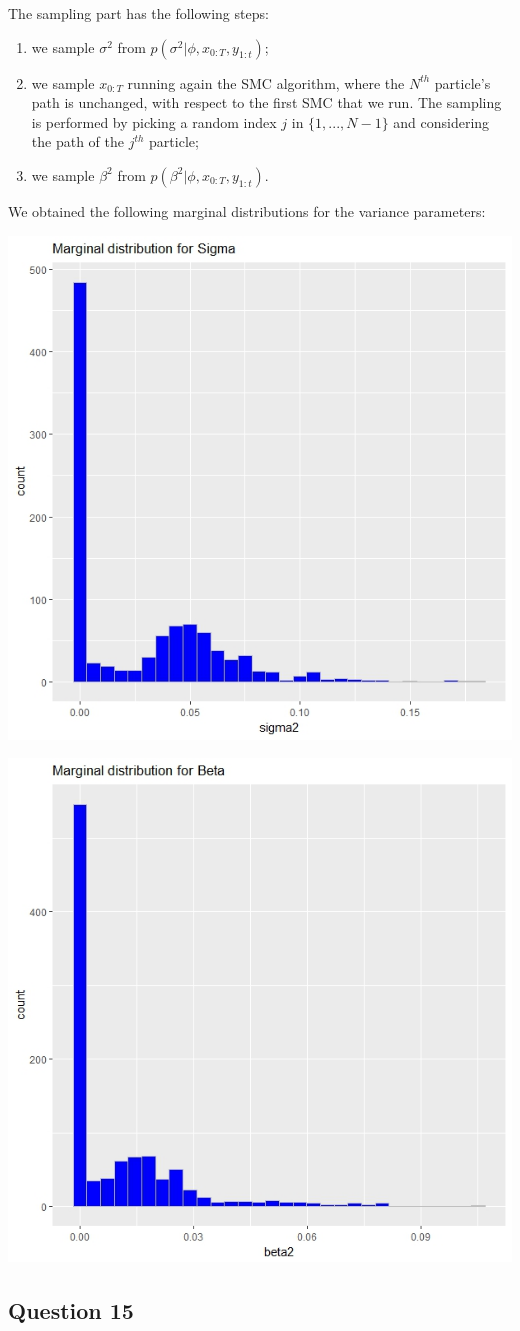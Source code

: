 \documentclass[]{article}
\begin{document}
The sampling part has the following steps:

\begin{enumerate}

	\item we sample $\sigma^2$ from $p(\sigma^2|\phi, x_{0:T}, y_{1:t})$;

	\item we sample $x_{0:T}$ running again the SMC algorithm, where  the $N^{th}$ particle's path is unchanged, with respect to the first SMC that we run. The sampling is performed by picking a random index $j$ in $\{1,...,N-1\}$ and considering the path of the $j^{th}$ particle;

	\item we sample $\beta^2$ from $p(\beta^2|\phi, x_{0:T}, y_{1:t})$.

\end{enumerate}


We obtained the following marginal distributions for the variance parameters:

\begin{center}

	\includegraphics[width=.4\textwidth]{task5/CSMC_sigma2.jpeg}

	\includegraphics[width=.4\textwidth]{task5/CSMC_beta2.jpeg}

\end{center}


\subsection*{Question 15}
\end{document}
